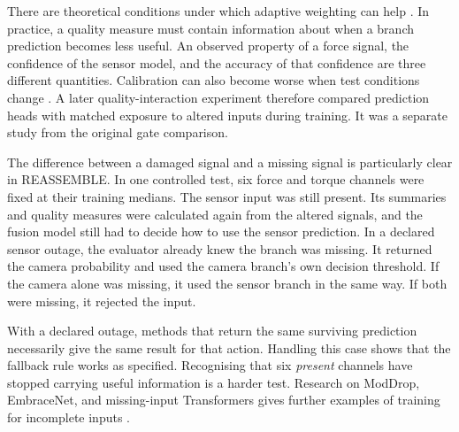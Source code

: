 There are theoretical conditions under which adaptive weighting can help
\parencite{Zhang2023QMF}. In practice, a quality measure must contain information about
when a branch prediction becomes less useful. An observed property of a force signal,
the confidence of the sensor model, and the accuracy of that confidence are three
different quantities. Calibration can also become worse when test conditions change
\parencite{P008}. A later quality-interaction experiment therefore compared prediction
heads with matched exposure to altered inputs during training. It was a separate study
from the original gate comparison.

The difference between a damaged signal and a missing signal is particularly clear in
REASSEMBLE. In one controlled test, six force and torque channels were fixed at their
training medians. The sensor input was still present. Its summaries and quality measures
were calculated again from the altered signals, and the fusion model still had to decide
how to use the sensor prediction. In a declared sensor outage, the evaluator already
knew the branch was missing. It returned the camera probability and used the camera
branch's own decision threshold. If the camera alone was missing, it used the sensor
branch in the same way. If both were missing, it rejected the input.

With a declared outage, methods that return the same surviving prediction necessarily
give the same result for that action. Handling this case shows that the fallback rule
works as specified. Recognising that six \textit{present} channels have stopped carrying
useful information is a harder test. Research on ModDrop, EmbraceNet, and missing-input
Transformers gives further examples of training for incomplete inputs
\parencite{P005,P007,P016}.

